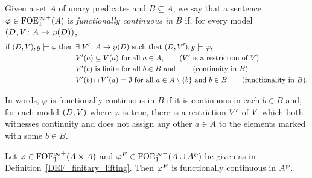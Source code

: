 \begin{definition} Given a set $A$ of unary predicates and $B \subseteq A$, we say that a sentence $\varphi \in {\ensuremath{\mathrm{FOE}^{\infty}_1}}^+(A)$ is \emph{functionally continuous in $B$} if, for every model $(D,V \colon A \to \wp(D))$,
\begin{align*}
\text{if } (D,\val),\ass \models \varphi \text{ then } & \exists\ \val' \: A \to \wp(D) \text{ such that } (D, \val'),\ass \models \varphi, \\
& \val'(a)\subseteq \val(a) \text{ for all } a \in A, \tag{$\val'$ is a restriction of $\val$}\\
 & \val'(b) \text{ is finite for all }b \in B \text{ and } \tag{continuity in $B$}\\
 & \val'(b)\cap \val'(a) = \emptyset \text{ for all } a \in A\setminus\{b\} \text{ and }b \in B\tag{functionality in $B$}.
\end{align*}
\end{definition}
In words, $\varphi$ is functionally continuous in $B$ if it is continuous in each $b \in B$ and, for each model $(D,V)$ where $\varphi$ is true, there is a restriction $V'$ of $V$ which both witnesses continuity and does not assign any other $a \in A$ to the elements marked with some $b \in B$.

\begin{lemma}\label{LEM_cont}
Let $\varphi \in {\ensuremath{\mathrm{FOE}^{\infty}_1}}^+(A \times A)$ and $\varphi^{F}\in {\ensuremath{\mathrm{FOE}^{\infty}_1}}^+(A\cup A^{\wp} )$ be given as in Definition~\ref{DEF_finitary_lifting}. Then $\varphi^{F}$ is functionally continuous in $A^{\wp}$.
 \end{lemma}


